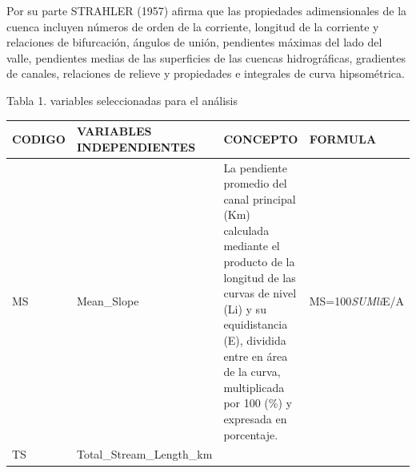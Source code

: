 \documentclass[11pt,]{article}
\begin{document}
Por su parte STRAHLER (1957) afirma que las propiedades adimensionales
de la cuenca incluyen números de orden de la corriente, longitud de la
corriente y relaciones de bifurcación, ángulos de unión, pendientes
máximas del lado del valle, pendientes medias de las superficies de las
cuencas hidrográficas, gradientes de canales, relaciones de relieve y
propiedades e integrales de curva hipsométrica.

Tabla 1. variables seleccionadas para el análisis

\begin{longtable}[]{@{}llll@{}}
\toprule
\begin{minipage}[b]{0.08\columnwidth}\raggedright\strut
CODIGO\strut
\end{minipage} & \begin{minipage}[b]{0.25\columnwidth}\raggedright\strut
VARIABLES INDEPENDIENTES\strut
\end{minipage} & \begin{minipage}[b]{0.44\columnwidth}\raggedright\strut
CONCEPTO\strut
\end{minipage} & \begin{minipage}[b]{0.12\columnwidth}\raggedright\strut
FORMULA\strut
\end{minipage}\tabularnewline
\midrule
\endhead
\begin{minipage}[t]{0.08\columnwidth}\raggedright\strut
MS\strut
\end{minipage} & \begin{minipage}[t]{0.25\columnwidth}\raggedright\strut
Mean\_Slope\strut
\end{minipage} & \begin{minipage}[t]{0.44\columnwidth}\raggedright\strut
La pendiente promedio del canal principal (Km) calculada mediante el
producto de la longitud de las curvas de nivel (Li) y su equidistancia
(E), dividida entre en área de la curva, multiplicada por 100 (\%) y
expresada en porcentaje.\strut
\end{minipage} & \begin{minipage}[t]{0.12\columnwidth}\raggedright\strut
MS=100\emph{SUMli}E/A\strut
\end{minipage}\tabularnewline
\begin{minipage}[t]{0.08\columnwidth}\raggedright\strut
TS\strut
\end{minipage} & \begin{minipage}[t]{0.25\columnwidth}\raggedright\strut
Total\_Stream\_Length\_km\strut
\end{minipage} & \begin{minipage}[t]{0.44\columnwidth}\raggedright\strut

\end{minipage}
\end{longtable}
\end{document}
